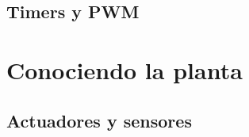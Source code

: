 \documentclass[compress]{beamer}
\begin{document}
\subsection{Timers y PWM}


\section{Conociendo la planta}

\subsection{Actuadores y sensores}
\end{document}
